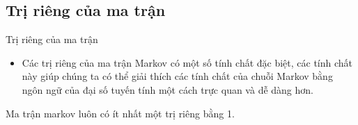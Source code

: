 \subsection{Trị riêng của ma trận}
\begin{frame}{Trị riêng của ma trận}
\begin{itemize}
    \item[\bullet] Các trị riêng của ma trận Markov có một số tính chất đặc biệt, các tính chất này giúp chúng ta có thể giải thích các tính chất của chuỗi Markov bằng ngôn ngữ của đại số tuyến tính một cách trực quan và dễ dàng hơn.
\end{itemize}
\vfill
    \begin{mytheo*}{}
        Ma trận markov luôn có ít nhất một trị riêng bằng 1.
    \end{mytheo*}
    \vfill
\end{frame}

